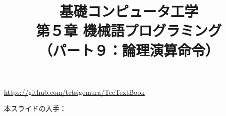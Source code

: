 \documentclass[handout]{beamer}        %
\begin{document}
\title{基礎コンピュータ工学\\第５章 機械語プログラミング\\
       （パート９：論理演算命令）}
\date{}

\begin{frame}
  \titlepage
  \centerline{\url{https://github.com/tctsigemura/TecTextBook}}
  \vfill
  \centerline{本スライドの入手：
    }
\end{frame}

\end{document}
